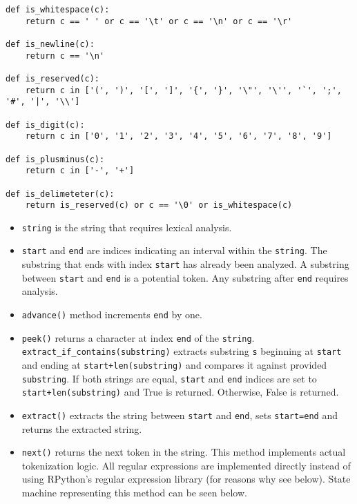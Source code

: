 \begin{lstlisting}
def is_whitespace(c):
    return c == ' ' or c == '\t' or c == '\n' or c == '\r'

def is_newline(c):
    return c == '\n'

def is_reserved(c): 
    return c in ['(', ')', '[', ']', '{', '}', '\"', '\'', '`', ';', '#', '|', '\\']

def is_digit(c):
    return c in ['0', '1', '2', '3', '4', '5', '6', '7', '8', '9']

def is_plusminus(c):
    return c in ['-', '+']

def is_delimeteter(c):
    return is_reserved(c) or c == '\0' or is_whitespace(c)
\end{lstlisting}


\begin{itemize}
\item
\texttt{string} is the string that requires lexical analysis.

\item
\texttt{start} and \texttt{end} are indices indicating an interval within the \texttt{string}. The substring that ends with index \texttt{start} has already been analyzed. A substring between \texttt{start} and \texttt{end} is a potential token. Any substring after \texttt{end} requires analysis.

\item
\texttt{advance()} method increments \texttt{end} by one.

\item
\texttt{peek()} returns a character at index \texttt{end} of the \texttt{string}.
\texttt{extract\_if\_contains(substring)} extracts substring \texttt{s} beginning at \texttt{start} and ending at \texttt{start+len(substring)} and compares it against provided \texttt{substring}. If both strings are equal, \texttt{start} and \texttt{end} indices are set to \texttt{start+len(substring)} and True is returned. Otherwise, False is returned.

\item
\texttt{extract()} extracts the string between \texttt{start} and \texttt{end}, sets \texttt{start=end} and returns the extracted string.

\item
\texttt{next()} returns the next token in the string. This method implements actual tokenization logic. All regular expressions are implemented directly instead of using RPython's regular expression library (for reasons why see below). State machine representing this method can be seen below.


\end{itemize}
